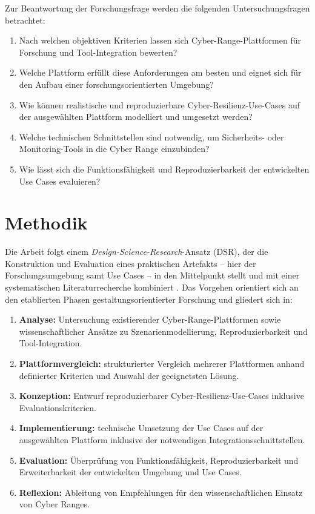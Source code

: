 Zur Beantwortung der Forschungsfrage werden die folgenden Untersuchungsfragen betrachtet:

\begin{enumerate}
  \item Nach welchen objektiven Kriterien lassen sich Cyber-Range-Plattformen für Forschung
        und Tool-Integration bewerten?
  \item Welche Plattform erfüllt diese Anforderungen am besten und eignet sich für den Aufbau
        einer forschungsorientierten Umgebung?
  \item Wie können realistische und reproduzierbare Cyber-Resilienz-Use-Cases auf der
        ausgewählten Plattform modelliert und umgesetzt werden?
  \item Welche technischen Schnittstellen sind notwendig, um Sicherheits- oder
        Monitoring-Tools in die Cyber Range einzubinden?
  \item Wie lässt sich die Funktionsfähigkeit und Reproduzierbarkeit der entwickelten Use
        Cases evaluieren?
\end{enumerate}

\section{Methodik}
\label{sec:methodik}

Die Arbeit folgt einem \emph{Design-Science-Research}-Ansatz (DSR), der die Konstruktion
und Evaluation eines praktischen Artefakts -- hier der Forschungsumgebung samt Use Cases --
in den Mittelpunkt stellt und mit einer systematischen Literaturrecherche kombiniert
\cite{Hevner2004DesignScience}. Das Vorgehen orientiert sich an den etablierten Phasen
gestaltungsorientierter Forschung \cite{Peffers2007DSRM} und gliedert sich in:

\begin{enumerate}
  \item \textbf{Analyse:} Untersuchung existierender Cyber-Range-Plattformen sowie
        wissenschaftlicher Ansätze zu Szenarienmodellierung, Reproduzierbarkeit und
        Tool-Integration.
  \item \textbf{Plattformvergleich:} strukturierter Vergleich mehrerer Plattformen anhand
        definierter Kriterien und Auswahl der geeignetsten Lösung.
  \item \textbf{Konzeption:} Entwurf reproduzierbarer Cyber-Resilienz-Use-Cases inklusive
        Evaluationskriterien.
  \item \textbf{Implementierung:} technische Umsetzung der Use Cases auf der ausgewählten
        Plattform inklusive der notwendigen Integrationsschnittstellen.
  \item \textbf{Evaluation:} Überprüfung von Funktionsfähigkeit, Reproduzierbarkeit und
        Erweiterbarkeit der entwickelten Umgebung und Use Cases.
  \item \textbf{Reflexion:} Ableitung von Empfehlungen für den wissenschaftlichen Einsatz von
        Cyber Ranges.
\end{enumerate}

